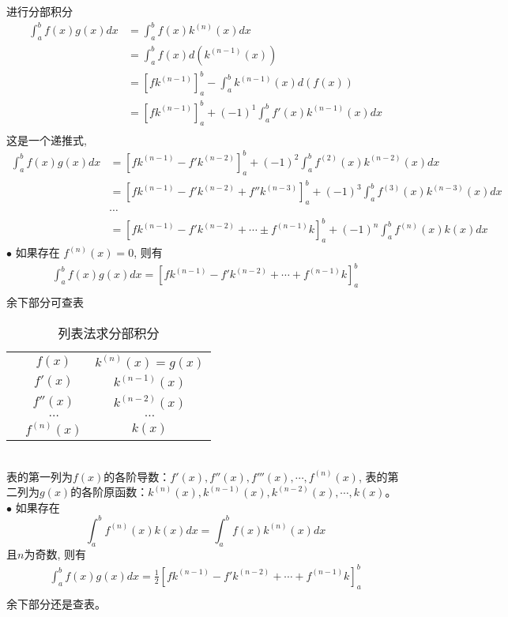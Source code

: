 进行分部积分
$$
\begin{aligned}
	\int_a ^b f(x)g(x)dx &= \int_a ^b f(x)k^{(n)}(x)dx \\ 
	&= \int_a ^b f(x)d(k^{(n-1)}(x)) \\
	&= \left[ fk^{(n-1)}\right] _a ^b - \int_a ^b k^{(n-1)}(x)d(f(x)) \\
	&= \left[ fk^{(n-1)}\right] _a ^b +(-1)^1 \int_a ^b f'(x)k^{(n-1)}(x)dx \\
\end{aligned} 
$$
这是一个递推式,
$$
\begin{aligned}
	  \int_a ^b f(x)g(x)dx &=\left[ fk^{(n-1)} - f'k^{(n-2)}  \right] _a ^b + (-1)^2 \int_a ^b f^{(2)}(x)k^{(n-2)}(x)dx \\
	  &=\left[ fk^{(n-1)} - f'k^{(n-2)} +  f''k^{(n-3)} \right] _a ^b + (-1)^3 \int_a ^b f^{(3)}(x)k^{(n-3)}(x)dx \\
	  &\cdots \\
	  &= \left[ fk^{(n-1)} - f'k^{(n-2)} + \cdots \pm f^{(n-1)}k\right]_a ^b  + (-1)^n \int_a ^b f^{(n)}(x)k(x)dx
  \end{aligned} 
$$
$ \bullet $ 如果存在 $ f^{(n)}(x) = 0 $, 则有 
$$
\begin{aligned}
	\int_a ^b f(x)g(x)dx = \left[ fk^{(n-1)} - f'k^{(n-2)} + \cdots + f^{(n-1)}k\right]_a ^b \\
\end{aligned} 
$$
余下部分可查表
  \renewcommand\arraystretch{1.5}  
\begin{table}[h]\label{tab:lb}
	  \caption{列表法求分部积分}
	  \centering
	  \begin{tabular}
	  {p{0.5cm}c|c}	
	  \toprule
	  & $f(x)$  & $k^{(n)}(x)=g(x)$ \\
	  & $f'(x)$  & $k^{(n-1)}(x)$ \\
	  & $f''(x)$  & $k^{(n-2)}(x)$ \\
	  & $\dots $  & $\dots $ \\
	  & $f^{(n)}(x)$  & $k(x)$ \\
	  \bottomrule
	  \end{tabular}
  \end{table}
~~\\ 
表的第一列为$f(x)$的各阶导数：$f'(x),f''(x), f'''(x), \cdots, f^{(n)}(x)$, 表的第二列为$ g(x)$的各阶原函数：$k^{(n)}(x), k^{(n-1)}(x), k^{(n-2)}(x),\cdots, k(x)$。\\
$ \bullet $ 如果存在 $$ \int_a ^b f^{(n)}(x)k(x)dx = \int_a ^b f(x)k^{(n)}(x)dx $$
且$ n $为奇数, 则有
$$ 
\begin{aligned}
	\int_a ^b f(x)g(x)dx = \frac{1}{2}\left[ fk^{(n-1)} - f'k^{(n-2)} + \cdots + f^{(n-1)}k\right]_a ^b \\
\end{aligned} 
$$
余下部分还是查表。

